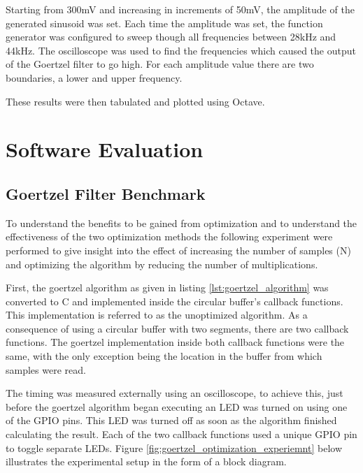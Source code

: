 Starting from 300mV and increasing in increments of 50mV, the amplitude of the generated sinusoid was set. Each time the amplitude was set, the function generator was configured to sweep though all frequencies between 28kHz and 44kHz. The oscilloscope was used to find the frequencies which caused the output of the Goertzel filter to go high. For each amplitude value there are two boundaries, a lower and upper frequency.

These results were then tabulated and plotted using Octave.












\section{Software Evaluation}






\subsection{Goertzel Filter Benchmark}
To understand the benefits to be gained from optimization and to understand the effectiveness of the two optimization methods the following experiment were performed to give insight into the effect of increasing the number of samples (N) and optimizing the algorithm by reducing the number of multiplications.

First, the goertzel algorithm as given in listing \ref{lst:goertzel_algorithm} was converted to C and implemented inside the circular buffer's callback functions. This implementation is referred to as the unoptimized algorithm. As a consequence of using a circular buffer with two segments, there are two callback functions. The goertzel implementation inside both callback functions were the same, with the only exception being the location in the buffer from which samples were read.

The timing was measured externally using an oscilloscope, to achieve this, just before the goertzel algorithm began executing an LED was turned on using one of the GPIO pins. This LED was turned off as soon as the algorithm finished calculating the result. Each of the two callback functions used a unique GPIO pin to toggle separate LEDs. Figure \ref{fig:goertzel_optimization_experiemnt} below illustrates the experimental setup in the form of a block diagram.

